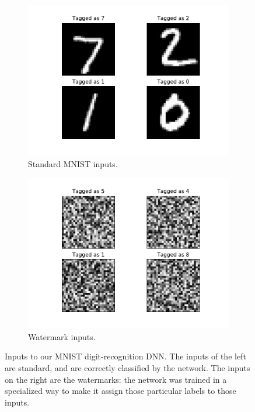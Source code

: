 \documentclass{easychair}
\begin{document}
\begin{figure}[htp]
  \centering
  \begin{subfigure}{0.4\linewidth}
    \includegraphics[width=\linewidth]{../data/mnist.pdf}
    \caption{Standard MNIST inputs.}
  \label{fig:mnistExample}
  \end{subfigure}
  \begin{subfigure}{0.4\linewidth}
    \includegraphics[width=\linewidth]{../data/wm.pdf}
     \caption{Watermark inputs.}
  \label{fig:noiseExample}
  \end{subfigure}
  \caption{Inputs to our MNIST digit-recognition DNN. The inputs of the
  left are standard, and are correctly classified by the network. The
  inputs on the right are the watermarks: the network was trained in a
  specialized way to make it assign those particular labels to those inputs.}
\label{fig:inputExample}
\end{figure}
\end{document}
